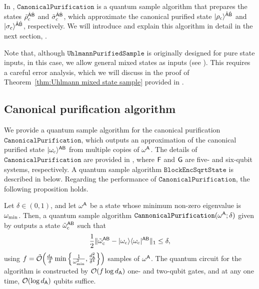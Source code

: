 In , $\mathtt{CanonicalPurification}$ is a quantum sample algorithm that prepares the states $\tilde{\rho}_{\rm c}^{\hat{{\mathsf{A}}}\hat{{\mathsf{B}}}}$ and $\tilde{\sigma}_{\rm c}^{\hat{{\mathsf{A}}}\hat{{\mathsf{B}}}}$, which approximate the canonical purified state $|\rho_{\rm c}\rangle^{\hat{{\mathsf{A}}}\hat{{\mathsf{B}}}}$ and $|\sigma_{\rm c}\rangle^{\hat{{\mathsf{A}}}\hat{{\mathsf{B}}}}$, respectively. We will introduce and explain this algorithm in detail in the next section, . 

Note that, although $\mathtt{UhlmannPurifiedSample}$ is originally designed for pure state inputs, in this case, we allow general mixed states as inputs (see ).
This requires a careful error analysis, which we will discuss in the proof of Theorem~\ref{thm:Uhlmann mixed state sample} provided in .












\subsection{Canonical purification algorithm}
\label{sec:appendix B}

We provide a quantum sample algorithm for the canonical purification $\mathtt{CanonicalPurification}$, which outputs an approximation of the canonical purified state $|\omega_{\rm c}\rangle^{{\mathsf{A}}{\mathsf{B}}}$ from multiple copies of $\omega^{\mathsf{A}}$. 
The details of $\mathtt{CanonicalPurification}$ are provided in , where ${\mathsf{F}}$ and ${\mathsf{G}}$ are five- and six-qubit systems, respectively.
A quantum sample algorithm $\mathtt{BlockEncSqrtState}$ is described in  below.
Regarding the performance of $\mathtt{CanonicalPurification}$, the following proposition holds.


\begin{theorem}
\label{prop:canonical purification}
Let $\delta \in (0, 1)$, and let $\omega^{\mathsf{A}}$ be a state whose minimum non-zero eigenvalue is $\omega_{\rm min}$. Then, a quantum sample algorithm $\mathtt{CannonicalPurification}(\omega^{\mathsf{A}}; \delta)$ given by  outputs a state $\tilde{\omega}_{\rm c}^{{\mathsf{A}}{\mathsf{B}}}$ such that
\begin{align}
    \frac{1}{2}\|\tilde{\omega}_{\rm c}^{{\mathsf{A}}{\mathsf{B}}} - |\omega_{\rm c}\rangle\langle\omega_{\rm c}|^{{\mathsf{A}}{\mathsf{B}}}\|_1 \leq \delta,
\end{align}
using $f = \tilde{{\mathcal{O}}}\Big(\frac{d_{\mathsf{A}}}{\delta}\min\Big\{\frac{1}{\omega_{\rm min}^2}, \frac{d_{\mathsf{A}}^2}{\delta^4}\Big\}\Big)$ samples of $\omega^{\mathsf{A}}$.
The quantum circuit for the algorithm is constructed by ${\mathcal{O}}(f\log d_{\mathsf{A}})$ one- and two-qubit gates, and at any one time, ${\mathcal{O}}(\log{d_{\mathsf{A}}})$ qubits suffice.
\end{theorem}



